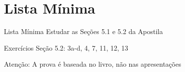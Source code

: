\section{Lista Mínima}

\begin{frame}{Lista Mínima}
  Estudar as Seções 5.1 e 5.2 da Apostila

  \vfill
  Exercícios Seção 5.2: 3a-d, 4, 7, 11, 12, 13

  \vfill
  Atenção: A prova é baseada no livro, não nas apresentações
\end{frame}


